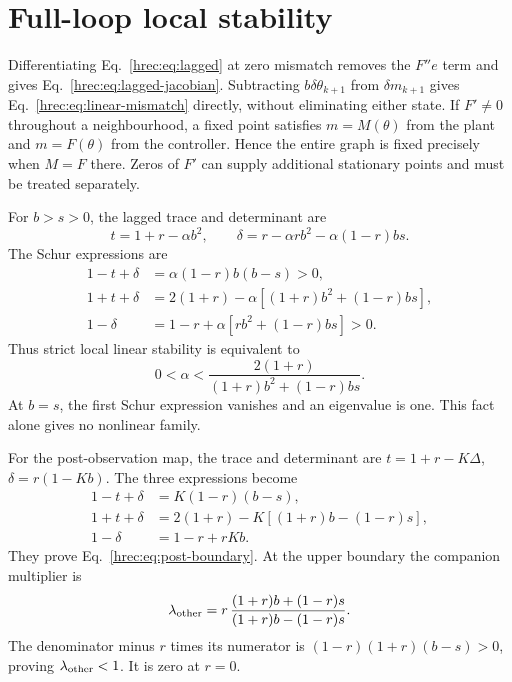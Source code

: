\section{Full-loop local stability}
\label{hrec:app:local}
Differentiating Eq.~\eqref{hrec:eq:lagged} at zero mismatch removes the \(F''e\) term and gives Eq.~\eqref{hrec:eq:lagged-jacobian}. Subtracting \(b\delta\theta_{k+1}\) from \(\delta m_{k+1}\) gives Eq.~\eqref{hrec:eq:linear-mismatch} directly, without eliminating either state. If \(F'\ne0\) throughout a neighbourhood, a fixed point satisfies \(m=M(\theta)\) from the plant and \(m=F(\theta)\) from the controller. Hence the entire graph is fixed precisely when \(M=F\) there. Zeros of \(F'\) can supply additional stationary points and must be treated separately.

For \(b>s>0\), the lagged trace and determinant are
\[
 t=1+r-\alpha b^2,\qquad
 \delta=r-\alpha r b^2-\alpha(1-r)bs.
\]
The Schur expressions are
\begin{align*}
 1-t+\delta&=\alpha(1-r)b(b-s)>0,\\
 1+t+\delta&=2(1+r)-\alpha[(1+r)b^2+(1-r)bs],\\
 1-\delta&=1-r+\alpha[rb^2+(1-r)bs]>0.
\end{align*}
Thus strict local linear stability is equivalent to
\[
 0<\alpha<
 \frac{2(1+r)}{(1+r)b^2+(1-r)bs}.
\]
At \(b=s\), the first Schur expression vanishes and an eigenvalue is one. This fact alone gives no nonlinear family.

For the post-observation map, the trace and determinant are
\(t=1+r-K\Delta\), \(\delta=r(1-Kb)\). The three expressions become
\begin{align*}
 1-t+\delta&=K(1-r)(b-s),\\
 1+t+\delta&=2(1+r)-K[(1+r)b-(1-r)s],\\
 1-\delta&=1-r+rKb.
\end{align*}
They prove Eq.~\eqref{hrec:eq:post-boundary}. At the upper boundary the companion multiplier is
\[
 \lambda_{\rm other}
 =r\,\frac{(1+r)b+(1-r)s}{(1+r)b-(1-r)s}.
\]
The denominator minus \(r\) times its numerator is
\((1-r)(1+r)(b-s)>0\), proving \(\lambda_{\rm other}<1\).
It is zero at \(r=0\).

